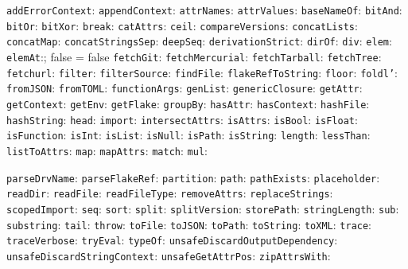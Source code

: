 \documentclass[10pt, a4paper, landscape]{article}
\newcommand{\cmd}[1]{\texttt{#1}}
\begin{document}
\begin{multicols*}{3}
\cmd{addErrorContext}:
\cmd{appendContext}:
\cmd{attrNames}:
\cmd{attrValues}:
\cmd{baseNameOf}:
\cmd{bitAnd}:
\cmd{bitOr}:
\cmd{bitXor}:
\cmd{break}:
\cmd{catAttrs}:
\cmd{ceil}:
\cmd{compareVersions}:
\cmd{concatLists}:
\cmd{concatMap}:
\cmd{concatStringsSep}:
\cmd{deepSeq}:
\cmd{derivationStrict}:
\cmd{dirOf}:
\cmd{div}:
\cmd{elem}:
\cmd{elemAt}:; false = false
\cmd{fetchGit}:
\cmd{fetchMercurial}:
\cmd{fetchTarball}:
\cmd{fetchTree}:
\cmd{fetchurl}:
\cmd{filter}:
\cmd{filterSource}:
\cmd{findFile}:
\cmd{flakeRefToString}:
\cmd{floor}:
\cmd{foldl'}:
\cmd{fromJSON}:
\cmd{fromTOML}:
\cmd{functionArgs}:
\cmd{genList}:
\cmd{genericClosure}:
\cmd{getAttr}:
\cmd{getContext}:
\cmd{getEnv}:
\cmd{getFlake}:
\cmd{groupBy}:
\cmd{hasAttr}:
\cmd{hasContext}:
\cmd{hashFile}:
\cmd{hashString}:
\cmd{head}:
\cmd{import}:
\cmd{intersectAttrs}:
\cmd{isAttrs}:
\cmd{isBool}:
\cmd{isFloat}:
\cmd{isFunction}:
\cmd{isInt}:
\cmd{isList}:
\cmd{isNull}:
\cmd{isPath}:
\cmd{isString}:
\cmd{length}:
\cmd{lessThan}:
\cmd{listToAttrs}:
\cmd{map}:
\cmd{mapAttrs}:
\cmd{match}:
\cmd{mul}:

\cmd{parseDrvName}:
\cmd{parseFlakeRef}:
\cmd{partition}:
\cmd{path}:
\cmd{pathExists}:
\cmd{placeholder}:
\cmd{readDir}:
\cmd{readFile}:
\cmd{readFileType}:
\cmd{removeAttrs}:
\cmd{replaceStrings}:
\cmd{scopedImport}:
\cmd{seq}:
\cmd{sort}:
\cmd{split}:
\cmd{splitVersion}:
\cmd{storePath}:
\cmd{stringLength}:
\cmd{sub}:
\cmd{substring}:
\cmd{tail}:
\cmd{throw}:
\cmd{toFile}:
\cmd{toJSON}:
\cmd{toPath}:
\cmd{toString}:
\cmd{toXML}:
\cmd{trace}:
\cmd{traceVerbose}:
\cmd{tryEval}:
\cmd{typeOf}:
\cmd{unsafeDiscardOutputDependency}:
\cmd{unsafeDiscardStringContext}:
\cmd{unsafeGetAttrPos}:
\cmd{zipAttrsWith}:

  

\end{multicols*}
\end{document}
